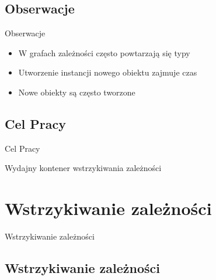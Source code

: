 \documentclass{beamer}
\begin{document}
\subsection*{Obserwacje}

\begin{frame}{Obserwacje}
  \begin{itemize}
  \item W grafach zależności często powtarzają się typy
  \item Utworzenie instancji nowego obiektu zajmuje czas
  \item Nowe obiekty są często tworzone
  \end{itemize}
\end{frame}

\subsection*{Cel Pracy}

\begin{frame}{Cel Pracy}
\begin{center}
Wydajny kontener wstrzykiwania zależności
\end{center}
\end{frame}


\section{Wstrzykiwanie zależności}

\begin{frame}{}
\begin{center}
\huge{Wstrzykiwanie zależności}
\end{center}
\end{frame}

\subsection*{Wstrzykiwanie zależności}
\end{document}
